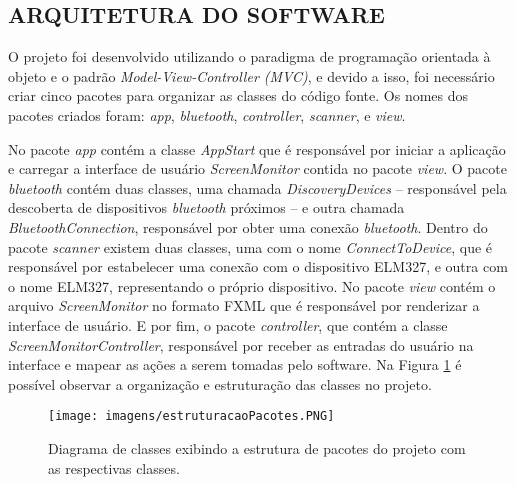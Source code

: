 \subsection{ARQUITETURA DO SOFTWARE}
O projeto foi desenvolvido utilizando o paradigma de programação orientada à objeto e o padrão \textit{Model-View-Controller (MVC)}, e devido a isso, foi necessário criar cinco pacotes para organizar as classes do código fonte. Os nomes dos pacotes criados foram: \textit{app}, \textit{bluetooth}, \textit{controller}, \textit{scanner}, e \textit{view}.

No pacote \textit{app} contém a classe \textit{AppStart} que é responsável por iniciar a aplicação e carregar a interface de usuário \textit{ScreenMonitor} contida no pacote \textit{view}. O pacote \textit{bluetooth} contém duas classes, uma chamada \textit{DiscoveryDevices} – responsável pela descoberta de dispositivos \textit{bluetooth} próximos – e outra chamada \textit{BluetoothConnection}, responsável por obter uma conexão \textit{bluetooth}. Dentro do pacote \textit{scanner} existem duas classes, uma com o nome \textit{ConnectToDevice}, que é responsável por estabelecer uma conexão com o dispositivo ELM327, e outra com o nome ELM327, representando o próprio dispositivo. No pacote \textit{view} contém o arquivo \textit{ScreenMonitor} no formato FXML que é responsável por renderizar a interface de usuário. E por fim, o pacote \textit{controller}, que contém a classe \textit{ScreenMonitorController}, responsável por receber as entradas do usuário na interface e mapear as ações a serem tomadas pelo software. Na Figura \ref{Fig:diagrama_classe} é possível observar a organização e estruturação das classes no projeto.

\begin{figure}[!ht]
\centering
\caption{Diagrama de classes exibindo a estrutura de pacotes do projeto com as respectivas classes.} 
{\texttt{[image: imagens/estruturacaoPacotes.PNG]}}\\
 \label{Fig:diagrama_classe}
\end{figure}

